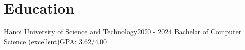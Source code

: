 \section{Education}
    \resumeSubHeadingListStart

    \resumeSubheading
    {Hanoi University of Science and Technology}{2020 - 2024}
    {Bachelor of Computer Science (excellent)}{GPA: 3.62/4.00}

    \resumeSubHeadingListEnd